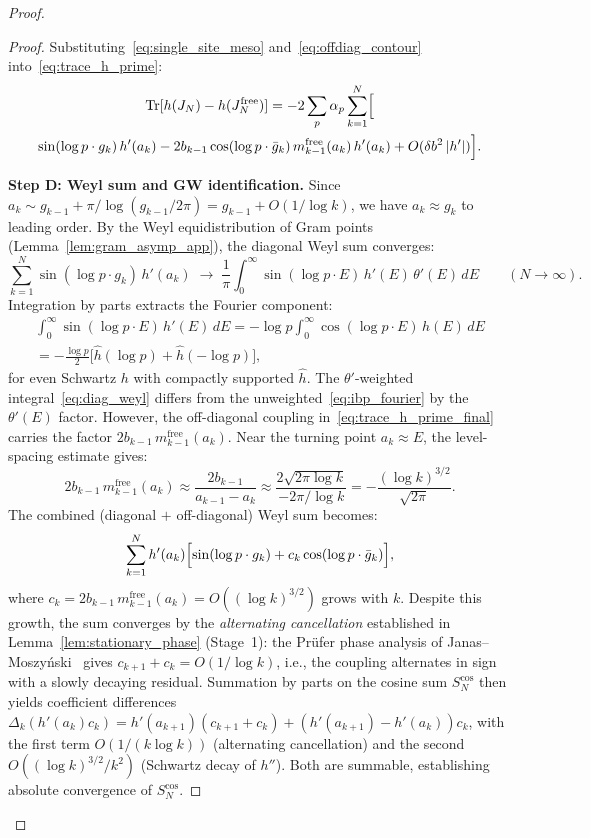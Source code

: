 \documentclass{pre-aomart}
\theoremstyle{plain}
\theoremstyle{definition}
\theoremstyle{remark}
\begin{document}
\begin{proof}
\begin{proof}
Substituting~\eqref{eq:single_site_meso} and~\eqref{eq:offdiag_contour}
into~\eqref{eq:trace_h_prime}:
\begin{multline}\label{eq:trace_h_prime_final}
\operatorname{Tr}[h(J_N) - h(J_N^{\mathrm{free}})]
= -2\sum_p \alpha_p\sum_{k=1}^{N}\Bigl[\\
  \sin(\log p \cdot g_k)\,h'(a_k)
  - 2b_{k-1}\cos(\log p \cdot \bar{g}_k)\,m_{k-1}^{\mathrm{free}}(a_k)\,h'(a_k)
  + O(\delta b^2\,|h'|)\Bigr].
\end{multline}

\textbf{Step D: Weyl sum and GW identification.}
Since $a_k \sim g_{k-1} + \pi/\log(g_{k-1}/2\pi) = g_{k-1} + O(1/\log k)$,
we have $a_k \approx g_k$ to leading order.
By the Weyl equidistribution of Gram points
(Lemma~\ref{lem:gram_asymp_app}), the diagonal Weyl sum converges:
\begin{equation}\label{eq:diag_weyl}
\sum_{k=1}^{N}\sin(\log p \cdot g_k)\,h'(a_k)
\;\longrightarrow\;
\frac{1}{\pi}\int_0^\infty \sin(\log p \cdot E)\,h'(E)\,\theta'(E)\,dE
\qquad(N \to \infty).
\end{equation}
Integration by parts extracts the Fourier component:
\begin{multline}\label{eq:ibp_fourier}
\int_0^\infty \sin(\log p \cdot E)\,h'(E)\,dE
= -\log p\int_0^\infty \cos(\log p \cdot E)\,h(E)\,dE\\
= -\frac{\log p}{2}\bigl[\hat{h}(\log p) + \hat{h}(-\log p)\bigr],
\end{multline}
for even Schwartz $h$ with compactly supported $\hat{h}$.
The $\theta'$-weighted integral~\eqref{eq:diag_weyl} differs from the
unweighted~\eqref{eq:ibp_fourier} by the $\theta'(E)$ factor.
However, the off-diagonal coupling in~\eqref{eq:trace_h_prime_final}
carries the factor $2b_{k-1}\,m_{k-1}^{\mathrm{free}}(a_k)$.
Near the turning point $a_k \approx E$, the level-spacing estimate gives:
\[
2b_{k-1}\,m_{k-1}^{\mathrm{free}}(a_k) \approx
\frac{2b_{k-1}}{a_{k-1} - a_k} \approx \frac{2\sqrt{2\pi\log k}}{-2\pi/\log k} = -\frac{(\log k)^{3/2}}{\sqrt{2\pi}}.
\]
The combined (diagonal $+$ off-diagonal) Weyl sum becomes:
\begin{equation}\label{eq:combined_weyl}
\sum_{k=1}^{N}h'(a_k)\Bigl[\sin(\log p \cdot g_k)
  + c_k\cos(\log p \cdot \bar{g}_k)\Bigr],
\end{equation}
where $c_k = 2b_{k-1}\,m_{k-1}^{\mathrm{free}}(a_k) = O((\log k)^{3/2})$
grows with $k$.  Despite this growth, the sum converges by the
\emph{alternating cancellation} established in
Lemma~\ref{lem:stationary_phase} (Stage~1): the Pr\"ufer phase
analysis of Janas--Moszy\'nski~\cite{JanasMoszynski2003} gives
$c_{k+1} + c_k = O(1/\log k)$, i.e., the coupling alternates in sign
with a slowly decaying residual.  Summation by parts on the cosine sum
$S_N^{\cos}$ then yields coefficient differences
$\Delta_k(h'(a_k)c_k) = h'(a_{k+1})(c_{k+1} + c_k) + (h'(a_{k+1}) - h'(a_k))c_k$,
with the first term $O(1/(k\log k))$ (alternating cancellation) and
the second $O((\log k)^{3/2}/k^2)$ (Schwartz decay of $h''$).  Both
are summable, establishing absolute convergence of $S_N^{\cos}$.


\end{proof}
\end{proof}
\end{document}
